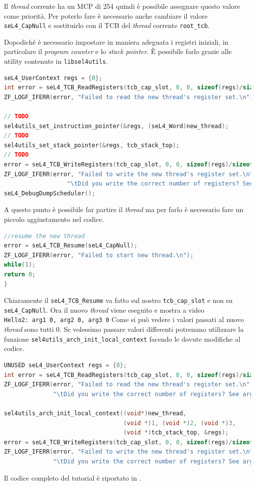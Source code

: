 Il \textit{thread} corrente ha un MCP di 254 quindi è possibile assegnare questo valore come priorità. Per poterlo fare è necessario anche cambiare il valore \texttt{seL4\_CapNull} e sostituirlo con il TCB del \textit{thread} corrente \texttt{root\_tcb}.

Dopodiché è necessario impostare in maniera adeguata i registri iniziali, in particolare il \textit{program counter} e lo \textit{stack pointer}. È possibile farlo grazie alle utility contenute in \texttt{libsel4utils}.
\begin{lstlisting}[language=C++]
seL4_UserContext regs = {0};
int error = seL4_TCB_ReadRegisters(tcb_cap_slot, 0, 0, sizeof(regs)/sizeof(seL4_Word), &regs);
ZF_LOGF_IFERR(error, "Failed to read the new thread's register set.\n");

// TODO
sel4utils_set_instruction_pointer(&regs, (seL4_Word)new_thread);
// TODO
sel4utils_set_stack_pointer(&regs, tcb_stack_top);
// TODO
error = seL4_TCB_WriteRegisters(tcb_cap_slot, 0, 0, sizeof(regs)/sizeof(seL4_Word), &regs);
ZF_LOGF_IFERR(error, "Failed to write the new thread's register set.\n"
                  "\tDid you write the correct number of registers? See arg4.\n");
seL4_DebugDumpScheduler();
\end{lstlisting}

A questo punto è possibile far partire il \textit{thread} ma per farlo è necessario fare un piccolo aggiustamento nel codice.
\begin{lstlisting}[language=C++]
//resume the new thread
error = seL4_TCB_Resume(seL4_CapNull);
ZF_LOGF_IFERR(error, "Failed to start new thread.\n");
while(1);
return 0;
}
\end{lstlisting}

Chiaramente il \texttt{seL4\_TCB\_Resume} va fatto sul nostro \texttt{tcb\_cap\_slot} e non su \texttt{seL4\_CapNull}. Ora il nuovo \textit{thread} viene eseguito e mostra a video\\
\texttt{Hello2: arg1 0, arg2 0, arg3 0}
Come si può vedere i valori passati al nuovo \textit{thread} sono tutti 0. Se volessimo passare valori differenti potremmo utilizzare la funzione \texttt{sel4utils\_arch\_init\_local\_context} facendo le dovute modifiche al codice.
\begin{lstlisting}[language=C++]
UNUSED seL4_UserContext regs = {0};
int error = seL4_TCB_ReadRegisters(tcb_cap_slot, 0, 0, sizeof(regs)/sizeof(seL4_Word), &regs);
ZF_LOGF_IFERR(error, "Failed to read the new thread's register set.\n"
              "\tDid you write the correct number of registers? See arg4.\n");

sel4utils_arch_init_local_context((void*)new_thread,
                                  (void *)1, (void *)2, (void *)3,
                                  (void *)tcb_stack_top, &regs);
error = seL4_TCB_WriteRegisters(tcb_cap_slot, 0, 0, sizeof(regs)/sizeof(seL4_Word), &regs);
ZF_LOGF_IFERR(error, "Failed to write the new thread's register set.\n"
              "\tDid you write the correct number of registers? See arg4.\n");
\end{lstlisting}
Il codice completo del tutorial è riportato in \cite{threads}.

